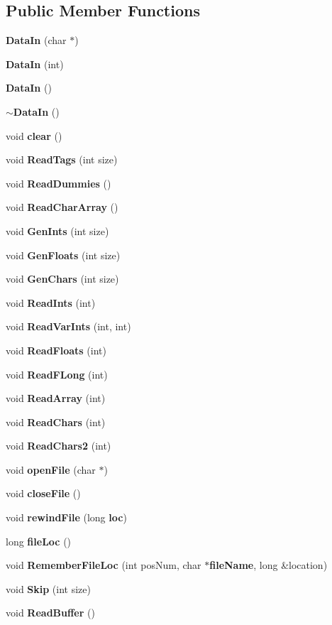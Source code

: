\subsection*{Public Member Functions}
\begin{CompactItemize}
\item 
{\bf Data\-In} (char $\ast$)
\item 
{\bf Data\-In} (int)
\item 
{\bf Data\-In} ()
\item 
{\bf $\sim$Data\-In} ()
\item 
void {\bf clear} ()
\item 
void {\bf Read\-Tags} (int size)
\item 
void {\bf Read\-Dummies} ()
\item 
void {\bf Read\-Char\-Array} ()
\item 
void {\bf Gen\-Ints} (int size)
\item 
void {\bf Gen\-Floats} (int size)
\item 
void {\bf Gen\-Chars} (int size)
\item 
void {\bf Read\-Ints} (int)
\item 
void {\bf Read\-Var\-Ints} (int, int)
\item 
void {\bf Read\-Floats} (int)
\item 
void {\bf Read\-FLong} (int)
\item 
void {\bf Read\-Array} (int)
\item 
void {\bf Read\-Chars} (int)
\item 
void {\bf Read\-Chars2} (int)
\item 
void {\bf open\-File} (char $\ast$)
\item 
void {\bf close\-File} ()
\item 
void {\bf rewind\-File} (long {\bf loc})
\item 
long {\bf file\-Loc} ()
\item 
void {\bf Remember\-File\-Loc} (int pos\-Num, char $\ast${\bf file\-Name}, long \&location)
\item 
void {\bf Skip} (int size)
\item 
void {\bf Read\-Buffer} ()
\end{CompactItemize}
